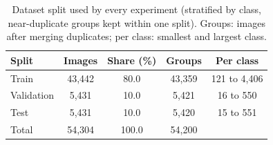 \begin{table}[!t]
\centering
\footnotesize
\caption{Dataset split used by every experiment (stratified by class, near-duplicate groups kept within one split). Groups: images after merging duplicates; per class: smallest and largest class.}
\label{tab:split}
\begin{tabular}{lcccc}
\toprule
Split & Images & Share (\%) & Groups & Per class \\
\midrule
Train & 43{,}442 & 80.0 & 43{,}359 & 121 to 4{,}406 \\
Validation & 5{,}431 & 10.0 & 5{,}421 & 16 to 550 \\
Test & 5{,}431 & 10.0 & 5{,}420 & 15 to 551 \\
Total & 54{,}304 & 100.0 & 54{,}200 &  \\
\bottomrule
\end{tabular}
\end{table}

